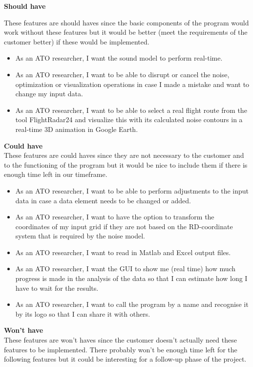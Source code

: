 \textbf{Should have}

These features are should haves since the basic components of the program would work without these features but it would be better (meet the requirements of the customer better) if these would be implemented. 

\begin{itemize}
\item As an ATO researcher, I want the sound model to perform real-time.
\item As an ATO researcher, I want to be able to disrupt or cancel the noise, optimization or visualization operations in case I made a mistake and want to change my input data.
\item As an ATO researcher, I want to be able to select a real flight route from the tool FlightRadar24 and visualize this with its calculated noise contours in a real-time 3D animation in Google Earth.
\end{itemize}

\textbf{Could have} \\
These features are could haves since they are not necessary to the customer and to the functioning of the program but it would be nice to include them if there is enough time left in our timeframe. 

\begin{itemize}
\item As an ATO researcher, I want to be able to perform adjustments to the input data in case a data element needs to be changed or added. 
\item As an ATO researcher, I want to have the option to transform the coordinates of my input grid if they are not based on the RD-coordinate system that is required by the noise model.
\item As an ATO researcher, I want to read in Matlab and Excel output files.
\item As an ATO researcher, I want the GUI to show me (real time) how much progress is made in the analysis of the data so that I can estimate how long I have to wait for the results.
\item As an ATO researcher, I want to call the program by a name and recognise it by its logo so that I can share it with others.
\end{itemize}

\textbf{Won't have} \\
These features are won't haves since the customer doesn't actually need these features to be implemented. There probably won't be enough time left for the following features but it could be interesting for a follow-up phase of the project. 


